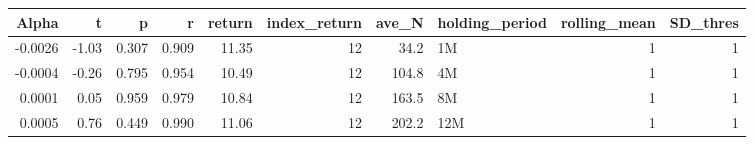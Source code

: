 \begin{table}[ht]
\centering
\begin{tabular}{rrrrrrrlrr}
  \hline
Alpha & t & p & r & return & index\_return & ave\_N & holding\_period & rolling\_mean & SD\_thres \\ 
  \hline
-0.0026 & -1.03 & 0.307 & 0.909 & 11.35 & 12 & 34.2 & 1M &  1 &  1 \\ 
  -0.0004 & -0.26 & 0.795 & 0.954 & 10.49 & 12 & 104.8 & 4M &  1 &  1 \\ 
  0.0001 & 0.05 & 0.959 & 0.979 & 10.84 & 12 & 163.5 & 8M &  1 &  1 \\ 
  0.0005 & 0.76 & 0.449 & 0.990 & 11.06 & 12 & 202.2 & 12M &  1 &  1 \\ 
   \hline
\end{tabular}
\end{table}

